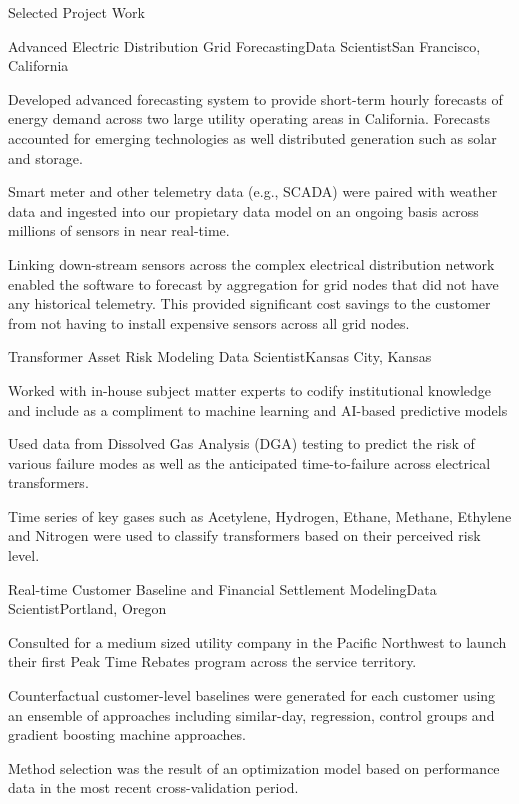 \documentclass{resume} %
\begin{document}
\begin{rSection}{Selected Project Work}
\begin{rSubsection}{Advanced Electric Distribution Grid Forecasting}{}{Data Scientist}{San Francisco, California}
\item[] Developed advanced forecasting system to provide short-term hourly forecasts of energy demand across two large utility operating areas in California. Forecasts accounted for emerging technologies as well distributed generation such as solar and storage.
\item[] Smart meter and other telemetry data (e.g., SCADA) were paired with weather data and ingested into our propietary data model on an ongoing basis across millions of sensors in near real-time.
\item[] Linking down-stream sensors across the complex electrical distribution network enabled the software to forecast by aggregation for grid nodes that did not have any historical telemetry. This provided significant cost savings to the customer from not having to install expensive sensors across all grid nodes.
\end{rSubsection}

\begin{rSubsection}{Transformer Asset Risk Modeling }{}{Data Scientist}{Kansas City, Kansas}
\item[] Worked with in-house subject matter experts to codify institutional knowledge and include as a compliment to machine learning and AI-based predictive models
\item[] Used data from Dissolved Gas Analysis (DGA) testing  to predict the risk of various failure modes as well as the anticipated time-to-failure across electrical transformers.
\item[] Time series of key gases such as Acetylene, Hydrogen, Ethane, Methane, Ethylene and Nitrogen were used to classify transformers based on their perceived risk level.
\end{rSubsection}

\begin{rSubsection}{Real-time Customer Baseline and Financial Settlement Modeling}{}{Data Scientist}{Portland, Oregon}
\item[] Consulted for a medium sized utility company in the Pacific Northwest to launch their first
Peak Time Rebates program across the service territory.
\item[] Counterfactual customer-level baselines were generated for each customer using an ensemble of approaches including similar-day, regression, control groups and gradient boosting machine approaches.
\item[] Method selection was the result of an optimization model based on performance data in the most recent cross-validation period.
\end{rSubsection}


\end{rSection}
\end{document}
